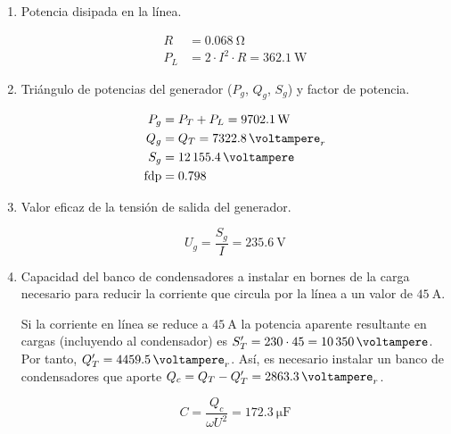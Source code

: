 \documentclass[12pt]{article}
\begin{document}
\begin{enumerate}
\item Potencia disipada en la línea.

  \begin{align*}
  R &= \SI{0.068}{\ohm}\\
  P_L &= 2 \cdot I^2 \cdot R = \SI{362.1}{\watt}
  \end{align*}

\item Triángulo de potencias del generador ($P_g$, $Q_g$, $S_g$) y factor de potencia.


  \begin{align*}
    P_g &= P_T + P_L = \SI{9702.1}{\watt}\\
    Q_g &= Q_T = \SI{7322.8}{\voltampere}_r\\
    S_g &= \SI{12155.4}{\voltampere}\\    
    \mathrm{fdp} &= 0.798
  \end{align*}

\item Valor eficaz de la tensión de salida del generador.

  \[
    U_g = \frac{S_g}{I} = \SI{235.6}{\volt}
  \]

\item Capacidad del banco de condensadores a instalar en bornes de la carga necesario para reducir la corriente que circula por la línea a un valor de $\SI{45}{\ampere}$.

  Si la corriente en línea se reduce a $\SI{45}{\ampere}$ la potencia aparente resultante en cargas (incluyendo al condensador) es $S'_T = 230 \cdot 45 = \SI{10350}{\voltampere}$. Por tanto, $Q'_T = \SI{4459.5}{\voltampere}_r$. Así, es necesario instalar un banco de condensadores que aporte $Q_c = Q_T - Q'_T = \SI{2863.3}{\voltampere}_r$.

\[
C = \frac{Q_c}{\omega U^2} = \SI{172.3}{\micro\farad}
\]

  
\end{enumerate}
\end{document}
